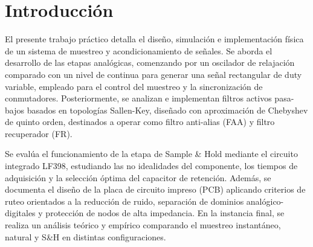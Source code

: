 \section{Introducción}

El presente trabajo práctico detalla el diseño, simulación e implementación física de un sistema de muestreo y acondicionamiento de señales. Se aborda el desarrollo de las etapas analógicas, comenzando por un oscilador de relajación comparado con un nivel de continua para generar una señal rectangular de duty variable, empleado para el control del muestreo y la sincronización de conmutadores. Posteriormente, se analizan e implementan filtros activos pasa-bajos basados en topologías Sallen-Key, diseñado con aproximación de Chebyshev de quinto orden, destinados a operar como filtro anti-alias (FAA) y filtro recuperador (FR).

Se evalúa el funcionamiento de la etapa de Sample \& Hold mediante el circuito integrado LF398, estudiando las no idealidades del componente, los tiempos de adquisición y la selección óptima del capacitor de retención. Además, se documenta el diseño de la placa de circuito impreso (PCB) aplicando criterios de ruteo orientados a la reducción de ruido, separación de dominios analógico-digitales y protección de nodos de alta impedancia. En la instancia final, se realiza un análisis teórico y empírico comparando el muestreo instantáneo, natural y S\&H en distintas configuraciones.